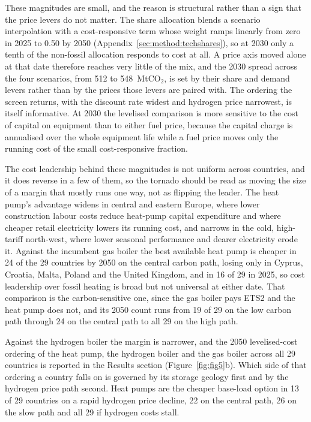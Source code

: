 These magnitudes are small, and the reason is structural rather than a sign that the
price levers do not matter. The share allocation blends a scenario interpolation with a
cost-responsive term whose weight ramps linearly from zero in 2025 to 0.50 by 2050
(Appendix~\ref{sec:method:techshares}), so at 2030 only a tenth of the non-fossil
allocation responds to cost at all. A price axis moved alone at that date therefore
reaches very little of the mix, and the 2030 spread across the four scenarios, from 512
to 548~MtCO$_2$, is set by their share and demand levers rather than by the prices those
levers are paired with. The ordering the screen returns, with the discount rate widest and
hydrogen price narrowest, is itself informative. At 2030 the levelised comparison is
more sensitive to the cost of capital on equipment than to either fuel price, because
the capital charge is annualised over the whole equipment life while a fuel price moves
only the running cost of the small cost-responsive fraction.

The cost leadership behind these magnitudes is not uniform across countries, and it does
reverse in a few of them, so the tornado should be read as moving the size of a margin
that mostly runs one way, not as flipping the leader. The heat pump's advantage widens
in central and eastern Europe, where lower construction labour costs reduce heat-pump
capital expenditure and where cheaper retail electricity lowers its running cost, and
narrows in the cold, high-tariff north-west, where lower seasonal performance and dearer
electricity erode it. Against the incumbent gas boiler the best available heat pump is
cheaper in 24 of the 29 countries by 2050 on the central carbon path, losing only in
Cyprus, Croatia, Malta, Poland and the United Kingdom, and in 16 of 29 in 2025, so cost
leadership over fossil heating is broad but not universal at either date. That
comparison is the carbon-sensitive one, since the gas boiler pays ETS2 and the heat pump
does not, and its 2050 count runs from 19 of 29 on the low carbon path through 24 on the
central path to all 29 on the high path.

Against the hydrogen boiler the margin is narrower, and the 2050 levelised-cost ordering
of the heat pump, the hydrogen boiler and the gas boiler across all 29 countries is
reported in the Results section (Figure~\ref{fig:fig5}b). Which side of that ordering a
country falls on is governed by its storage geology first and by the hydrogen price path
second. Heat pumps are the cheaper base-load option in 13 of 29 countries on a rapid
hydrogen price decline, 22 on the central path, 26 on the slow path and all 29 if
hydrogen costs stall.

